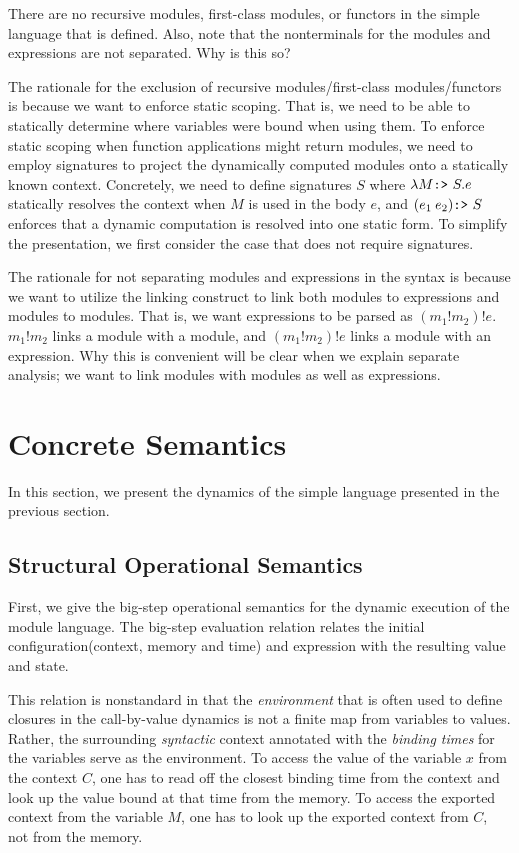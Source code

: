 \documentclass[acmsmall,screen,review]{acmart}
\theoremstyle{definition}
\newcommand*{\link}[2]{{#1}\mathtt{!}{#2}}
\newcommand*{\project}{\text{\texttt{:>} }}
\begin{document}
There are no recursive modules, first-class modules, or functors in the simple language that is defined.
Also, note that the nonterminals for the modules and expressions are not separated. Why is this so?

The rationale for the exclusion of recursive modules/first-class modules/functors is because we want to enforce static scoping.
That is, we need to be able to statically determine where variables were bound when using them.
To enforce static scoping when function applications might return modules, we need to employ signatures to project the dynamically computed modules onto a statically known context.
Concretely, we need to define signatures $S$ where $\lambda M\project S.e$ statically resolves the context when $M$ is used in the body $e$, and $(e_1\:e_2)\project S$ enforces that a dynamic computation is resolved into one static form.
To simplify the presentation, we first consider the case that does not require signatures.

The rationale for not separating modules and expressions in the syntax is because we want to utilize the linking construct to link both modules to expressions and modules to modules.
That is, we want expressions to be parsed as $(m_1!m_2)!e$.
$\link{m_1}{m_2}$ links a module with a module, and $(m_1!m_2)!e$ links a module with an expression.
Why this is convenient will be clear when we explain separate analysis; we want to link modules with modules as well as expressions.

\section{Concrete Semantics}

In this section, we present the dynamics of the simple language presented in the previous section.

\subsection{Structural Operational Semantics}

First, we give the big-step operational semantics for the dynamic execution of the module language.
The big-step evaluation relation relates the initial configuration(context, memory and time) and expression with the resulting value and state.

This relation is nonstandard in that the \emph{environment} that is often used to define closures in the call-by-value dynamics is not a finite map from variables to values.
Rather, the surrounding \emph{syntactic} context annotated with the \emph{binding times} for the variables serve as the environment.
To access the value of the variable $x$ from the context $C$, one has to read off the closest binding time from the context and look up the value bound at that time from the memory.
To access the exported context from the variable $M$, one has to look up the exported context from $C$, not from the memory.
\end{document}
